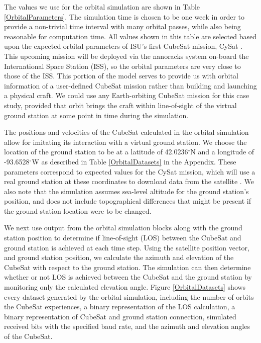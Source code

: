 \documentclass[conf]{new-aiaa}
\begin{document}
The values we use for the orbital simulation are shown in Table \ref{OrbitalParameters}. %
The simulation time is chosen to be one week in order to provide a non-trivial %
time interval with many orbital passes, while also being reasonable for computation time. All values shown in this table are selected based upon the expected orbital parameters of ISU's first CubeSat mission, CySat \cite{Nelson2020}. This upcoming mission will be deployed via the nanoracks system on-board the International Space Station (ISS), so the orbital parameters are very close to those of the ISS. This portion of the model serves to provide us with orbital information of a user-defined CubeSat mission rather than building and launching a physical craft. We could use any Earth-orbiting CubeSat mission for this case study, provided that orbit brings the craft within line-of-sight of the virtual ground station at some point in time during the simulation. 

The positions and velocities of the CubeSat calculated in the orbital simulation allow for imitating its interaction with a virtual ground station. We choose the location of the ground station to be at a latitude of 42.0236$^{\circ}$N and a longitude of -93.6528$^{\circ}$W as described in Table \ref{OrbitalDatasets} in the Appendix. These parameters correspond to expected values for the CySat mission, which will use a real ground station at these coordinates to download data from the satellite \cite{Nelson2020}. We also note that the simulation assumes sea-level altitude for the ground station's position, and does not include topographical differences that might be present if the ground station location were to be changed.

We next use output from the orbital simulation blocks along with the ground station position to determine if line-of-sight (LOS) between the CubeSat and ground station is achieved at each time step. Using the satellite position vector, and ground station position, we calculate the azimuth and elevation of the CubeSat with respect to the ground station. The simulation can then determine whether or not LOS is achieved between the CubeSat and the ground station by monitoring only the calculated elevation angle. Figure \ref{OrbitalDatasets} shows every dataset generated by the orbital simulation, including the number of orbits the CubeSat experiences, a binary representation of the LOS calculation, a binary representation of CubeSat and ground station connection, simulated received bits with the specified baud rate, and the azimuth and elevation angles of the CubeSat.
\end{document}
